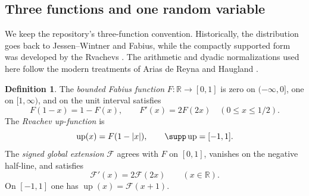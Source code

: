 \documentclass[11pt,oneside]{article}
\theoremstyle{definition}
\newtheorem{definition}[theorem]{Definition}
\theoremstyle{remark}
\newcommand{\Up}{\operatorname{up}}
\newcommand{\R}{\mathbb R}
\newcommand{\1}{\mathbf 1}
\begin{document}
\subsection{Three functions and one random variable}

We keep the repository's three-function convention.  Historically, the distribution goes
back to Jessen--Wintner and Fabius, while the compactly supported form was developed by the
Rvachevs \cite{p3:jessen1935,p3:fabius1966,p3:rvachev1971,p3:rvachev1990}.  The arithmetic and dyadic
normalizations used here follow the modern treatments of Arias de Reyna and Haugland
\cite{p3:arias1982,p3:arias2018,p3:haugland2016}.

\begin{definition}
The \emph{bounded Fabius function} $F:\R\to[0,1]$ is zero on $(-\infty,0]$, one on
$[1,\infty)$, and on the unit interval satisfies
\begin{equation}
 F(1-x)=1-F(x),\qquad F'(x)=2F(2x)\quad(0\le x\le1/2).
 \label{p3:eq:F-laws}
\end{equation}
The \emph{Rvachev up-function} is
\begin{equation}
 \Up(x)=F(1-|x|),\qquad \supp\Up=[-1,1].
 \label{p3:eq:up-fold}
\end{equation}
The \emph{signed global extension} $\mathcal F$ agrees with $F$ on $[0,1]$, vanishes on the
negative half-line, and satisfies
\begin{equation}
 \mathcal F'(x)=2\mathcal F(2x)\qquad(x\in\R).
 \label{p3:eq:global-diff}
\end{equation}
On $[-1,1]$ one has $\Up(x)=\mathcal F(x+1)$.
\end{definition}
\end{document}

